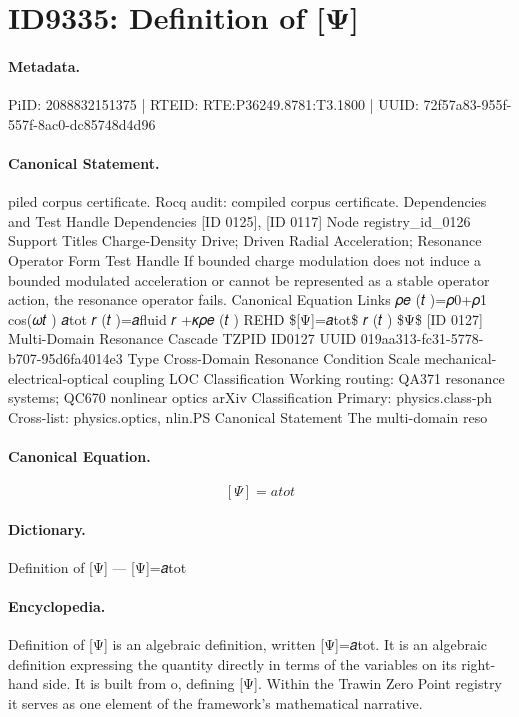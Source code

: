 \section*{ID9335: Definition of [Ψ]}
\paragraph{Metadata.}
PiID: 2088832151375 | RTEID: RTE:P36249.8781:T3.1800 | UUID: 72f57a83-955f-557f-8ac0-dc85748d4d96

\paragraph{Canonical Statement.}
piled corpus certificate. Rocq audit: compiled corpus certificate. Dependencies and Test Handle Dependencies [ID 0125], [ID 0117] Node registry\_id\_0126 Support Titles Charge-Density Drive; Driven Radial Acceleration; Resonance Operator Form Test Handle If bounded charge modulation does not induce a bounded modulated acceleration or cannot be represented as a stable operator action, the resonance operator fails. Canonical Equation Links 𝜌𝑒 (𝑡 )=𝜌0+𝜌1 cos(𝜔𝑡 ) 𝑎tot 𝑟 (𝑡 )=𝑎fluid 𝑟 +𝜅𝜌𝑒 (𝑡 ) REHD \$[Ψ]=𝑎tot\$ 𝑟 (𝑡 ) \$Ψ\$ [ID 0127] Multi-Domain Resonance Cascade TZPID ID0127 UUID 019aa313-fc31-5778-b707-95d6fa4014e3 Type Cross-Domain Resonance Condition Scale mechanical-electrical-optical coupling LOC Classification Working routing: QA371 resonance systems; QC670 nonlinear optics arXiv Classification Primary: physics.class-ph Cross-list: physics.optics, nlin.PS Canonical Statement The multi-domain reso

\paragraph{Canonical Equation.}
\[
[Ψ]=𝑎tot
\]

\paragraph{Dictionary.}
Definition of [Ψ] — [Ψ]=𝑎tot

\paragraph{Encyclopedia.}
Definition of [Ψ] is an algebraic definition, written [Ψ]=𝑎tot. It is an algebraic definition expressing the quantity directly in terms of the variables on its right-hand side. It is built from o, defining [Ψ]. Within the Trawin Zero Point registry it serves as one element of the framework's mathematical narrative.
